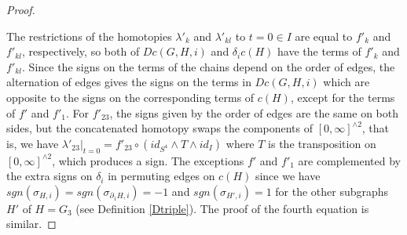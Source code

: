 \documentclass[reqno]{amsart}
\theoremstyle{definition}
\theoremstyle{plain}
\begin{document}
\begin{proof}
\begin{figure}[H]
\end{figure}\vspace{-0.4cm}The restrictions of the homotopies $\lambda'_k$ and $\lambda'_{kl}$ to $t=0\in I$ are equal to  $f'_{k}$ and $f'_{kl}$, respectively,  so both of $Dc(G,H,i)$ and $\delta_ic(H)$ have the terms of $f'_k$ and $f'_{kl}$. Since the signs on the terms of the chains  depend on the order of edges, the alternation of edges gives the  signs on the terms in $Dc(G,H,i)$ which are opposite to the signs on the corresponding terms of $c(H)$, except for the terms of $f'$ and $f'_1$. For $f'_{23}$, the signs given by the order of edges are the same on both sides, but the concatenated homotopy  swaps the components of $[0,\infty]^{\wedge 2}$, that is,  we have $\lambda'_{23}|_{t=0}=f'_{23}\circ (id_{S^4}\wedge T\wedge id_I)$ where $T$ is the transposition on $[0,\infty]^{\wedge 2}$, which produces a sign.   The exceptions $f'$ and $f'_1$ are complemented by the extra signs on $\delta_i$ in permuting  edges on $c(H)$  since we have 
$sgn(\sigma_{H,i})=sgn(\sigma_{\partial_1H,i})=-1$ and $sgn(\sigma_{H',i})=1$ for the other subgraphs $H'$ of $H=G_3$ (see Definition \ref{Dtriple}).  The proof of the fourth equation is similar.
\end{proof}
\end{document}
